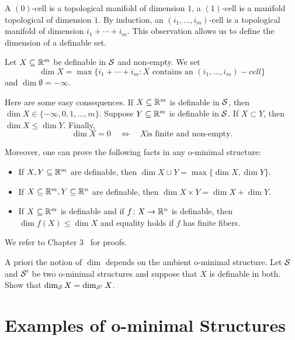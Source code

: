 A $(0)$-cell is a topological manifold of dimension $1$, a $(1)$-cell
is a manifold topological of dimension $1$. By induction, an
$(i_1,\ldots,i_m)$-cell is a topological manifold of dimension
$i_1+\cdots+i_m$. This observation allows us to define the dimension
of a definable set.
 
\begin{definition}
  Let $X\subseteq{\mathbb{R}}^m$ be definable in ${\mathcal S}$ and non-empty. We set
  \begin{equation*}
    \dim X = \max \{i_1+\cdots+i_m: X\text{ contains an
    }(i_1,\ldots,i_m)-cell\}
  \end{equation*}
  and $\dim \emptyset=-\infty$. 
\end{definition}

\begin{remark}
  Here are some easy consequences. If $X\subseteq{\mathbb{R}}^m$ is definable in
  ${\mathcal S}$, then $\dim X \in\{-\infty,0,1,\ldots,m\}$.
  Suppose $Y\subseteq{\mathbb{R}}^m$ is definable in ${\mathcal S}$. If $X\subset Y$, then
  $\dim X\le \dim Y$. 
  Finally,
  \begin{equation*}
    \dim X = 0 \quad\Longleftrightarrow\quad \text{$X$
      is finite and non-empty.}
  \end{equation*}

  Moreover, one can prove the following facts in any o-minimal structure:
  \begin{itemize}  
  \item If $X,Y\subseteq{\mathbb{R}}^m$ are definable, then  $\dim X\cup Y = \max\{\dim X,\dim Y\}$.
  \item If $X\subseteq{\mathbb{R}}^m,Y\subseteq{\mathbb{R}}^n$ are definable, then  $\dim
    X\times Y = \dim X +\dim Y$.
  \item If $X\subseteq{\mathbb{R}}^m$ is definable and if $f\colon
    X\rightarrow{\mathbb{R}}^n$ is definable, then $\dim f(X) \le \dim X$ and
    equality holds if $f$ has finite fibers.
  \end{itemize}

  We refer to Chapter 3~\cite{D:oMin} for proofs. 
\end{remark}

\begin{exercise}
  A priori the notion of $\dim$ depends on the ambient o-minimal
  structure. Let ${\mathcal S}$ and ${\mathcal S}'$ be two o-minimal structures and
  suppose that $X$ is definable in both. Show that $\dim_{{\mathcal S}} X =
  \dim_{{\mathcal S}'} X$.
\end{exercise}

\section{Examples of o-minimal Structures}

